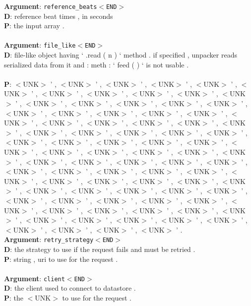 \textbf{Argument}: \texttt{reference\_beats$<$END$>$}\\
\textbf{D}: reference beat times , in seconds\\
\textbf{P}: the input array .\\
\\

\textbf{Argument}: \texttt{file\_like$<$END$>$}\\
\textbf{D}: file-like object having ` .read ( n ) ` method . if specified , unpacker reads serialized data from it and : meth : ` feed ( ) ` is not usable .\\
\\
\textbf{P}: $<$UNK$>$ ' , $<$UNK$>$ ' , $<$UNK$>$ ' , $<$UNK$>$ ' , $<$UNK$>$ ' , $<$UNK$>$ ' , $<$UNK$>$ ' , $
<$UNK$>$ ' , $<$UNK$>$ ' , $<$UNK$>$ ' , $<$UNK$>$ ' , $<$UNK$>$ ' , $<$UNK$>$ ' , $<$UNK$>$ ' , $<$UNK$>$ ' , $<$UNK$>$ ' , $<$UNK$>$ ' , $<$UNK$>$ ' , $<$UNK$>$ ' , $<$UNK$>$ ' , $<$UNK$>$ ' , $<$UNK$>$ ' , $<$UNK$>$ ' , $<$UNK$>$ ' , $<$UNK$>$ ' , $<$UNK$>$ ' , $<$UNK$>$ ' , $<$UNK$>$ ' , $<$UNK$>$ ' , $<$UNK$>$ ' , $<$UNK$>$ ' , $<$UNK$>$ ' , $<$UNK$>$ ' , $<$UNK$>$ ' , $<$UNK$>$ ' , $<$UNK$>$ ' , $<$UNK$>$ ' , $<$UNK$>$ ' , $<$UNK$>$ ' , $<$UNK$>$ ' , $<$UNK$>$ ' , $<$UNK$>$ ' , $<$UNK$>$ ' , $<$UNK$>$ ' , $<$UNK$>$ ' , $<$UNK$>$ ' , $<$UNK$>$ ' , $<$UNK$>$ ' , $<$UNK$>$ ' , $<$UNK$>$ ' , $<$UNK$>$ ' , $<$UNK$>$ ' , $<$UNK$>$ ' , $<$UNK$>$ ' , $<$UNK$>$ ' , $<$UNK$>$ ' , $<$UNK$>$ ' , $<$UNK$>$ ' , $<$UNK$>$ ' , $<$UNK$>$ ' , $<$UNK$>$ ' , $<$UNK$>$ ' , $<$UNK$>$ ' , $<$UNK$>$ ' , $<$UNK$>$ ' , $<$UNK$>$ ' , $<$UNK$>$ ' , $<$UNK$>$ ' , $<$UNK$>$ ' , $<$UNK$>$ ' , $<$UNK$>$ ' , $<$UNK$>$ ' , $<$UNK$>$ ' , $<$UNK$>$ ' , $<$UNK$>$ ' , $<$UNK$>$ ' , $<$UNK$>$ ' , $<$UNK$>$ ' , $<$UNK$>$ ' , $<$UNK$>$ ' , $<$UNK$>$ ' , $<$UNK$>$ ' , $<$UNK$>$ ' , $<$UNK$>$ ' .\\
\textbf{Argument}: \texttt{retry\_strategy$<$END$>$}\\
\textbf{D}: the strategy to use if the request fails and must be retried .\\
\textbf{P}: string , uri to use for the request .\\
\\

\textbf{Argument}: \texttt{client$<$END$>$}\\
\textbf{D}: the client used to connect to datastore .\\
\textbf{P}: the $<$UNK$>$ to use for the request .\\



